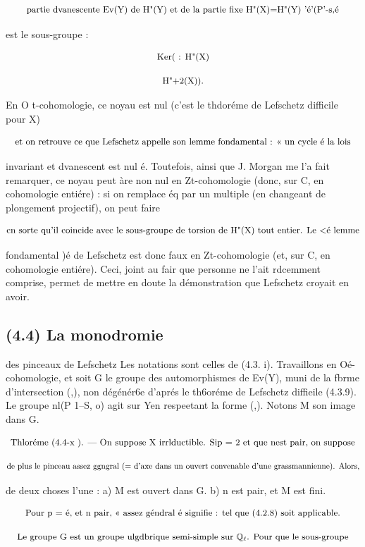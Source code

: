 \documentclass[11pt]{article}
\theoremstyle{remark}
\begin{document}
\[\text{\small partie dvanescente Ev(Y) de H"(Y) et de la partie fixe H"(X)=H"(Y) 'é'(P'-s,é}\]

est le sous-groupe :

\[\text{\small Ker(   : H"(X)}\]

\[\text{\small H"+2(X)).}\]

En O t-cohomologie, ce noyau est nul (c'est le thdoréme de Lefschetz difficile pour X)

\[\text{\small et on retrouve ce que Lefschetz appelle son lemme fondamental : << un cycle é la lois}\]

invariant et dvanescent est nul é. Toutefois, ainsi que J. Morgan me l'a fait remarquer, ce noyau peut àre non nul en Zt-cohomologie (donc, sur C, en cohomologie entiére) : si on remplace éq par un multiple (en changeant de plongement projectif), on peut faire

\[\text{\small cn sorte qu'il coincide avec le sous-groupe de torsion de H"(X) tout entier. Le <é lemme}\]

fondamental )é de Lefschetz est donc faux en Zt-cohomologie (et, sur C, en cohomologie entiére). Ceci, joint au fair que personne ne l'ait rdcemment comprise, permet de mettre en doute la démonstration que Lefschetz croyait en avoir.

\subsection*{(4.4) La monodromie}

des pinceaux de Lefschetz Les notations sont celles de (4.3. i). Travaillons en Oé-cohomologie, et soit G le groupe des automorphismes de Ev(Y), muni de la fbrme d'intersection (,), non dégénér6e d'aprés le th6oréme de Lefschetz diffieile (4.3.9). Le groupe nl(P 1--S, o) agit sur Yen respeetant la forme (,). Notons M son image dans G.

\[\text{\small Thloréme (4.4-x ). --- On suppose X irrlductible. Sip = 2 et que nest pair, on suppose}\]

\[\text{\small de plus le pinceau assez ggngral (= d'axe dans un ouvert convenable d'une grassmannienne). Alors,}\]

de deux choses l'une : a) M est ouvert dans G. b) n est pair, et M est fini.

\[\text{\small Pour p = é, et n pair, << assez géndral é signifie : tel que (4.2.8) soit applicable.}\]

\[\text{\small Le groupe G est un groupe ulgdbrique semi-simple sur \(\mathbb{Q}_{\ell}\). Pour que le sous-groupe}\]
\end{document}

